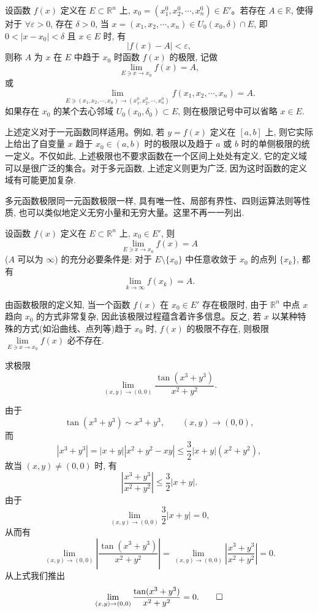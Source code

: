 \begin{definition}\label{definition:ma-13-2-2}
设函数 $f(x)$ 定义在 $E\subset\mathbb R^n$ 上, $x_0=(x_1^0,x_2^0,\cdots,x_n^0)\in E'$。若存在 $A\in\mathbb R$, 使得对于 $\forall\varepsilon>0$, 存在 $\delta>0$, 当 $x=(x_1,x_2,\cdots,x_n)\in U_0(x_0,\delta)\cap E$, 即 $0<|x-x_0|<\delta$ 且 $x\in E$ 时, 有
\[
  |f(x)-A|<\varepsilon,
\]
则称 $A$ 为 $x$ 在 $E$ 中趋于 $x_0$ 时函数 $f(x)$ 的极限, 记做
\[
  \lim_{E\ni x\to x_0}f(x)=A,
\]
或
\[
  \lim_{E\ni(x_1,x_2,\cdots,x_n)\to(x_1^0,x_2^0,\cdots,x_n^0)}
  f(x_1,x_2,\cdots,x_n)=A.
\]
如果存在 $x_0$ 的某个去心邻域 $U_0(x_0,\delta_0)\subset E$, 则在极限记号中可以省略 $x\in E$.
\end{definition}

上述定义对于一元函数同样适用。例如, 若 $y=f(x)$ 定义在 $[a,b]$ 上, 则它实际上给出了自变量 $x$ 趋于 $x_0\in(a,b)$ 时的极限以及趋于 $a$ 或 $b$ 时的单侧极限的统一定义。不仅如此, 上述极限也不要求函数在一个区间上处处有定义, 它的定义域可以是很广泛的集合。对于多元函数, 上述定义则更为广泛, 因为这时函数的定义域有可能更加复杂.

多元函数极限同一元函数极限一样, 具有唯一性、局部有界性、四则运算法则等性质, 也可以类似地定义无穷小量和无穷大量。这里不再一一列出.

\begin{theorem}\label{theorem:ma-13-2-1}
设函数 $f(x)$ 定义在 $E\subset\mathbb R^n$ 上, $x_0\in E'$, 则
\[
  \lim_{E\ni x\to x_0}f(x)=A
\]
($A$ 可以为 $\infty$) 的充分必要条件是: 对于 $E\setminus\{x_0\}$ 中任意收敛于 $x_0$ 的点列 $\{x_k\}$, 都有
\[
  \lim_{k\to\infty}f(x_k)=A.
\]
\end{theorem}

由函数极限的定义知, 当一个函数 $f(x)$ 在 $x_0\in E'$ 存在极限时, 由于 $\mathbb R^n$ 中点 $x$ 趋向 $x_0$ 的方式非常复杂, 因此该极限过程蕴含着许多信息。反之, 若 $x$ 以某种特殊的方式(如沿曲线、点列等)趋于 $x_0$ 时, $f(x)$ 的极限不存在, 则极限 $\lim\limits_{E\ni x\to x_0}f(x)$ 必不存在.

\begin{example}\label{example:ma-13-2-2}
求极限
\[
  \lim_{(x,y)\to(0,0)}\frac{\tan(x^3+y^3)}{x^2+y^2}.
\]
\end{example}


\begin{solve}
由于
\[
  \tan(x^3+y^3)\sim x^3+y^3,\qquad (x,y)\to(0,0),
\]
而
\[
  |x^3+y^3|=|x+y||x^2+y^2-xy|
  \leqslant \frac32 |x+y|(x^2+y^2),
\]
故当 $(x,y)\ne(0,0)$ 时, 有
\[
  \left|\frac{x^3+y^3}{x^2+y^2}\right|\leqslant \frac32|x+y|.
\]
由于
\[
  \lim_{(x,y)\to(0,0)}\frac32|x+y|=0,
\]
从而有
\[
  \lim_{(x,y)\to(0,0)}
  \left|\frac{\tan(x^3+y^3)}{x^2+y^2}\right|
  =\lim_{(x,y)\to(0,0)}
  \left|\frac{x^3+y^3}{x^2+y^2}\right|=0.
\]
从上式我们推出
\[
  \lim_{(x,y)\to(0,0)}\frac{\tan(x^3+y^3)}{x^2+y^2}=0.
\qedhere
\]
\end{solve}


